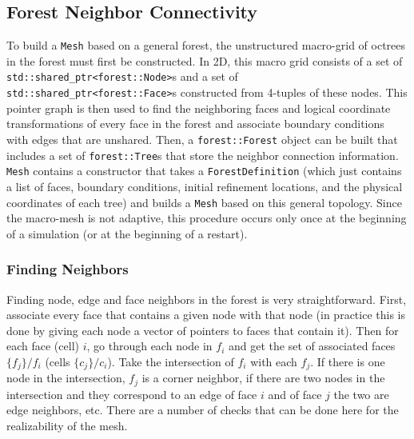 \documentclass{article}
\begin{document}
\subsection{Forest Neighbor Connectivity}
To build a \texttt{Mesh} based on a general forest, the unstructured macro-grid of octrees in the forest must first be constructed. In 2D, this macro grid consists of a set of \texttt{std::shared\_ptr<forest::Node>}s and a set of \texttt{std::shared\_ptr<forest::Face>}s constructed from 4-tuples of these nodes. This pointer graph is then used to find the neighboring faces and logical coordinate transformations of every face in the forest and associate boundary conditions with edges that are unshared. Then, a \texttt{forest::Forest} object can be built that includes a set of \texttt{forest::Tree}s that store the neighbor connection information. \texttt{Mesh} contains a constructor that takes a \texttt{ForestDefinition} (which just contains a list of faces, boundary conditions, initial refinement locations, and the physical coordinates of each tree) and builds a \texttt{Mesh} based on this general topology. Since the macro-mesh is not adaptive, this procedure occurs only once at the beginning of a simulation (or at the beginning of a restart). 

\subsubsection{Finding Neighbors}
Finding node, edge and face neighbors in the forest is very straightforward. First, associate every face that contains a given node with that node (in practice this is done by giving each node a vector of pointers to faces that contain it). Then for each face (cell) $i$, go through each node in $f_i$ and get the set of associated faces $\{f_j\} / f_i$ (cells $\{c_j\} / c_i$). Take the intersection of $f_i$ with each $f_j$. If there is one node in the intersection, $f_j$ is a corner neighbor, if there are two nodes in the intersection and they correspond to an edge of face $i$ and of face $j$ the two are edge neighbors, etc. There are a number of checks that can be done here for the realizability of the mesh. 
\end{document}
